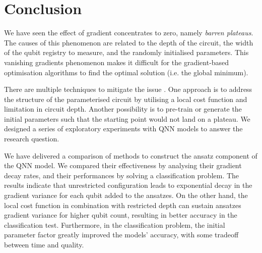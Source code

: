 \section{Conclusion}
We have seen the effect of gradient concentrates to zero, namely \emph{barren plateaus}.
The causes of this phenomenon are related to the depth of the circuit, the width of the qubit registry to measure, and the randomly initialised parameters.
This vanishing gradients phenomenon makes it difficult for the gradient-based optimisation algorithms to find the optimal solution (i.e. the global minimum).

There are multiple techniques to mitigate the issue \cite{cerezoCostFunctionDependent2021, skolikLayerwiseLearningQuantum2021, grantInitializationStrategyAddressing2019}.
One approach is to address the structure of the parameterised circuit by utilising a local cost function and limitation in circuit depth.
Another possibility is to pre-train or generate the initial parameters such that the starting point would not land on a plateau.
We designed a series of exploratory experiments with QNN models to answer the research question.

We have delivered a comparison of methods to construct the ansatz component of the QNN model.
We compared their effectiveness by analysing their gradient decay rates, and their performances by solving a classification problem.
The results indicate that unrestricted configuration leads to exponential decay in the gradient variance for each qubit added to the ansatzes.
On the other hand, the local cost function in combination with restricted depth can sustain ansatzes gradient variance for higher qubit count, resulting in better accuracy in the classification test.
Furthermore, in the classification problem, the initial parameter factor greatly improved the models' accuracy, with some tradeoff between time and quality.



